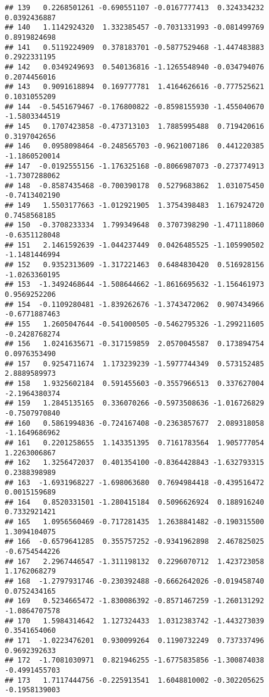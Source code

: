 \documentclass[
]{article}
\begin{document}
\begin{verbatim}
## 139   0.2268501261 -0.690551107 -0.0167777413  0.324334232  0.0392436887
## 140   1.1142924320  1.332385457 -0.7031331993 -0.081499769  0.8919824698
## 141   0.5119224909  0.378183701 -0.5877529468 -1.447483883  0.2922331195
## 142   0.0349249693  0.540136816 -1.1265548940 -0.034794076  0.2074456016
## 143   0.9091618894  0.169777781  1.4164626616 -0.777525621  0.1031055209
## 144  -0.5451679467 -0.176800822 -0.8598155930 -1.455040670 -1.5803344519
## 145   0.1707423858 -0.473713103  1.7885995488  0.719420616  0.3197042656
## 146   0.0958098464 -0.248565703 -0.9621007186  0.441220385 -1.1860520014
## 147  -0.0192555156 -1.176325168 -0.8066987073 -0.273774913 -1.7307288062
## 148  -0.8587435468 -0.700390178  0.5279683862  1.031075450 -0.7413402190
## 149   1.5503177663 -1.012921905  1.3754398483  1.167924720  0.7458568185
## 150  -0.3708233334  1.799349648  0.3707398290 -1.471118060 -0.6351128048
## 151   2.1461592639 -1.044237449  0.0426485525 -1.105990502 -1.1481446994
## 152   0.9352313609 -1.317221463  0.6484830420  0.516928156 -1.0263360195
## 153  -1.3492468644 -1.508644662 -1.8616695632 -1.156461973  0.9569252206
## 154  -0.1109280481 -1.839262676 -1.3743472062  0.907434966 -0.6771887463
## 155   1.2605047644 -0.541000505 -0.5462795326 -1.299211605 -0.2428768274
## 156   1.0241635671 -0.317159859  2.0570045587  0.173894754  0.0976353490
## 157   0.9254711674  1.173239239 -1.5977744349  0.573152485  2.8889589973
## 158   1.9325602184  0.591455603 -0.3557966513  0.337627004 -2.1964380374
## 159   1.2845135165  0.336070266 -0.5973508636 -1.016726829 -0.7507970840
## 160   0.5861994836 -0.724167408 -0.2363857677  2.089318058 -1.1649686962
## 161   0.2201258655  1.143351395  0.7161783564  1.905777054  1.2263006867
## 162   1.3256472037  0.401354100 -0.8364428843 -1.632793315  0.2388398989
## 163  -1.6931968227 -1.698063680  0.7694984418 -0.439516472  0.0015159689
## 164   0.8520331501 -1.280415184  0.5096626924  0.188916240  0.7332921421
## 165   1.0956560469 -0.717281435  1.2638841482 -0.190315500  1.3094104075
## 166  -0.6579641285  0.355757252 -0.9341962898  2.467825025 -0.6754544226
## 167   2.2967446547 -1.311198132  0.2296070712  1.423723058  1.1762068279
## 168  -1.2797931746 -0.230392488 -0.6662642026 -0.019458740  0.0752434165
## 169   0.5234665472 -1.830086392 -0.8571467259 -1.260131292 -1.0864707578
## 170   1.5984314642  1.127324433  1.0312383742 -1.443273039  0.3541654060
## 171  -1.0223476201  0.930099264  0.1190732249  0.737337496  0.9692392633
## 172  -1.7081030971  0.821946255 -1.6775835856 -1.300874038 -0.4991455703
## 173   1.7117444756 -0.225913541  1.6048810002 -0.302205625 -0.1958139003

\end{verbatim}
\end{document}
